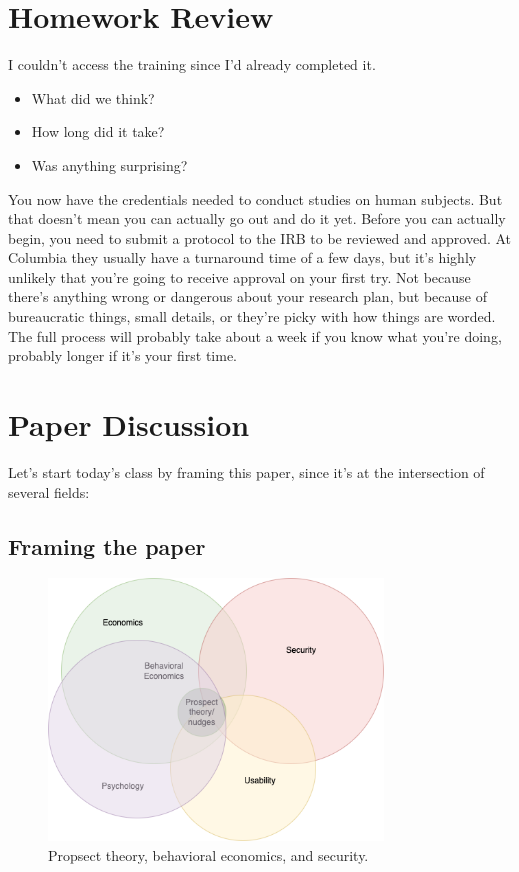 \documentclass[11pt]{article}
\begin{document}
\section{Homework Review}

I couldn't access the training since I'd already completed it. 
\begin{itemize}
    \item What did we think?
    \item How long did it take?
    \item Was anything surprising?
\end{itemize}

You now have the credentials needed to conduct studies on human subjects. 
But that doesn't mean you can actually go out and do it yet. 
Before you can actually begin, you need to submit a protocol to the IRB to be reviewed and approved.
At Columbia they usually have a turnaround time of a few days, but it's highly unlikely that you're going to receive approval on your first try. 
Not because there's anything wrong or dangerous about your research plan, but because of bureaucratic things, small details, or they're picky with how things are worded.
The full process will probably take about a week if you know what you're doing, probably longer if it's your first time.






\section{Paper Discussion}

Let's start today's class by framing this paper, since it's at the intersection of several fields:

\FloatBarrier
\subsection{Framing the paper}

\begin{figure}[h]
    \centering
    \includegraphics*[width=3.5in]{venn.png}
    \caption{Propsect theory, behavioral economics, and security.}
    \label{fig:venn}
\end{figure}
\FloatBarrier
\end{document}
